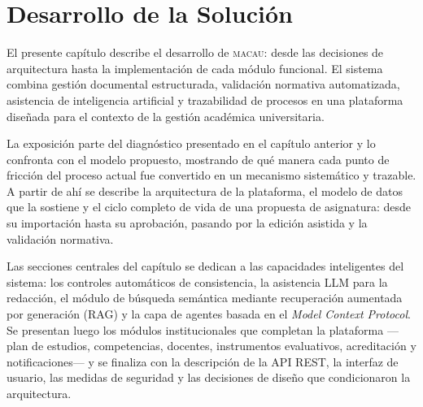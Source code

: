 \chapter{Desarrollo de la Solución}
\label{ch:desarrollo}

%

El presente capítulo describe el desarrollo de \textsc{macau}: desde las
decisiones de arquitectura hasta la implementación de cada módulo funcional.
El sistema combina gestión documental estructurada, validación normativa
automatizada, asistencia de inteligencia artificial y trazabilidad de
procesos en una plataforma diseñada para el contexto de la gestión
académica universitaria.

La exposición parte del diagnóstico presentado en el capítulo anterior y
lo confronta con el modelo propuesto, mostrando de qué manera cada punto
de fricción del proceso actual fue convertido en un mecanismo sistemático
y trazable.
A partir de ahí se describe la arquitectura de la plataforma, el modelo
de datos que la sostiene y el ciclo completo de vida de una propuesta de
asignatura: desde su importación hasta su aprobación, pasando por la edición
asistida y la validación normativa.

Las secciones centrales del capítulo se dedican a las capacidades
inteligentes del sistema: los controles automáticos de consistencia,
la asistencia LLM para la redacción, el módulo de búsqueda semántica
mediante recuperación aumentada por generación (RAG) y la capa de
agentes basada en el \emph{Model Context Protocol}.
Se presentan luego los módulos institucionales que completan la plataforma
---plan de estudios, competencias, docentes, instrumentos evaluativos,
acreditación y notificaciones--- y se finaliza con la descripción de la
API REST, la interfaz de usuario, las medidas de seguridad y las
decisiones de diseño que condicionaron la arquitectura.

